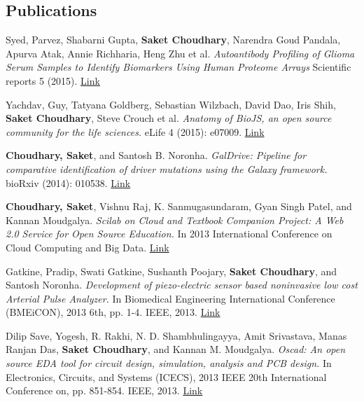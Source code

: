\documentclass[margin,line]{res}
\begin{document}
\begin{resume}

\section{\sc Publications}

Syed, Parvez, Shabarni Gupta, \textbf{Saket Choudhary}, Narendra Goud Pandala, Apurva Atak, Annie Richharia, Heng Zhu et al. \emph{Autoantibody Profiling of Glioma Serum Samples to Identify Biomarkers Using Human Proteome Arrays} Scientific reports 5 (2015). \href{http://dx.doi.org/10.1038\%2Fsrep13895}{Link}

Yachdav, Guy, Tatyana Goldberg, Sebastian Wilzbach, David Dao, Iris Shih, \textbf{Saket Choudhary}, Steve Crouch et al. \emph{Anatomy of BioJS, an open source community for the life sciences.} eLife 4 (2015): e07009. \href{http://dx.doi.org/10.7554/eLife.07009}{Link}

\textbf{Choudhary, Saket}, and Santosh B. Noronha. \emph{GalDrive: Pipeline for comparative identification of driver mutations using the Galaxy framework.} bioRxiv (2014): 010538.  \href{http://dx.doi.org/10.1101/010538}{Link}

\textbf{Choudhary, Saket}, Vishnu Raj, K. Sanmugasundaram, Gyan Singh Patel, and Kannan Moudgalya. \emph{Scilab on Cloud and Textbook Companion Project: A Web 2.0 Service for Open Source Education.} In 2013 International Conference on Cloud Computing and Big Data. \href{http://dx.doi.org/10.1109/CLOUDCOM-ASIA.2013.92}{Link}

Gatkine, Pradip, Swati Gatkine, Sushanth Poojary, \textbf{Saket Choudhary}, and Santosh Noronha. \emph{Development of piezo-electric sensor based noninvasive low cost Arterial Pulse Analyzer.} In Biomedical Engineering International Conference (BMEiCON), 2013 6th, pp. 1-4. IEEE, 2013. \href{http://dx.doi.org/10.1109/BMEiCon.2013.6687701}{Link}

Dilip Save, Yogesh, R. Rakhi, N. D. Shambhulingayya, Amit Srivastava, Manas Ranjan Das, \textbf{Saket Choudhary}, and Kannan M. Moudgalya. \emph{Oscad: An open source EDA tool for circuit design, simulation, analysis and PCB design.} In Electronics, Circuits, and Systems (ICECS), 2013 IEEE 20th International Conference on, pp. 851-854. IEEE, 2013. \href{http://dx.doi.org/10.1109/ICECS.2013.6815548}{Link}



\end{resume}
\end{document}
